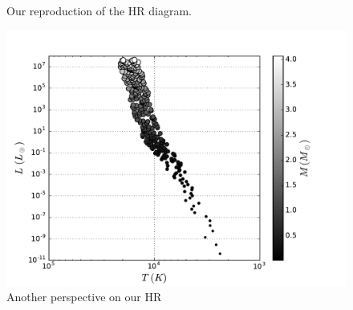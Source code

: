 \documentclass[10pt]{article}
\begin{document}
\begin{figure}[p]
\begin{centering}

\caption{Our reproduction of the HR diagram.}
\label{fig:HR}
\end{centering}
\end{figure}

\begin{figure}[p]
\begin{centering}
\includegraphics[width=\textwidth]{extra_hr.pdf}
\caption{Another perspective on our HR}
\label{fig:extraHR}
\end{centering}
\end{figure}
\end{document}

